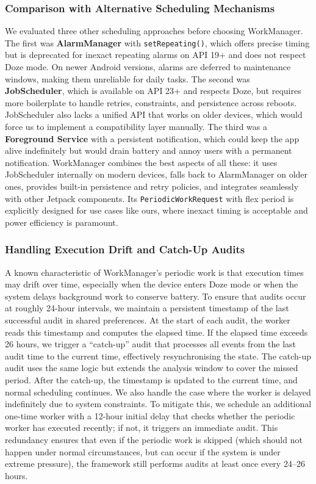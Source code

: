 \subsubsection{Comparison with Alternative Scheduling Mechanisms}

We evaluated three other scheduling approaches before choosing WorkManager. The first was \textbf{AlarmManager} with \texttt{setRepeating()}, which offers precise timing but is deprecated for inexact repeating alarms on API 19+ and does not respect Doze mode. On newer Android versions, alarms are deferred to maintenance windows, making them unreliable for daily tasks. The second was \textbf{JobScheduler}, which is available on API 23+ and respects Doze, but requires more boilerplate to handle retries, constraints, and persistence across reboots. JobScheduler also lacks a unified API that works on older devices, which would force us to implement a compatibility layer manually. The third was a \textbf{Foreground Service} with a persistent notification, which could keep the app alive indefinitely but would drain battery and annoy users with a permanent notification. WorkManager combines the best aspects of all these: it uses JobScheduler internally on modern devices, falls back to AlarmManager on older ones, provides built-in persistence and retry policies, and integrates seamlessly with other Jetpack components. Its \texttt{PeriodicWorkRequest} with flex period is explicitly designed for use cases like ours, where inexact timing is acceptable and power efficiency is paramount.

\subsubsection{Handling Execution Drift and Catch-Up Audits}

A known characteristic of WorkManager's periodic work is that execution times may drift over time, especially when the device enters Doze mode or when the system delays background work to conserve battery. To ensure that audits occur at roughly 24-hour intervals, we maintain a persistent timestamp of the last successful audit in shared preferences. At the start of each audit, the worker reads this timestamp and computes the elapsed time. If the elapsed time exceeds 26 hours, we trigger a ``catch-up'' audit that processes all events from the last audit time to the current time, effectively resynchronising the state. The catch-up audit uses the same logic but extends the analysis window to cover the missed period. After the catch-up, the timestamp is updated to the current time, and normal scheduling continues. We also handle the case where the worker is delayed indefinitely due to system constraints. To mitigate this, we schedule an additional one-time worker with a 12-hour initial delay that checks whether the periodic worker has executed recently; if not, it triggers an immediate audit. This redundancy ensures that even if the periodic work is skipped (which should not happen under normal circumstances, but can occur if the system is under extreme pressure), the framework still performs audits at least once every 24–26 hours.

